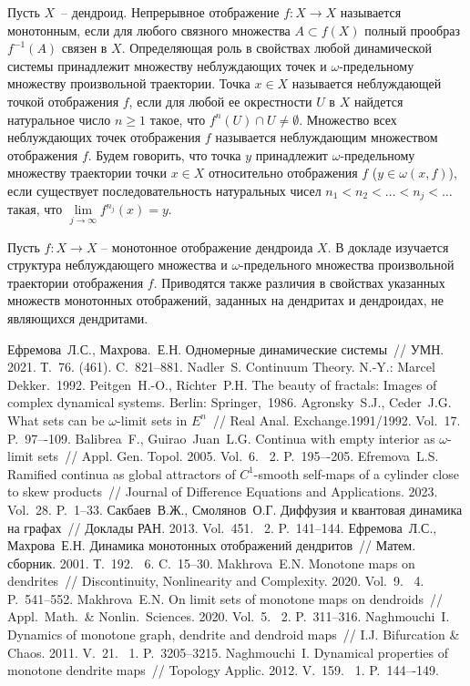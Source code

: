 Пусть $X$~-- дендроид. Непрерывное отображение  $f:X\to X$  называется монотонным, если для любого связного множества $A\subset f(X)$ полный прообраз $f^{-1}(A)$ связен в $X$. Определяющая роль в свойствах любой динамической системы принадлежит множеству неблуждающих точек и $\omega$-предельному множеству произвольной траектории. Точка $x\in X$ называется неблуждающей точкой отображения $f$, если для любой ее окрестности $U$ в $X$ найдется натуральное число $n\ge1$ такое, что $f^n(U)\cap U\ne\emptyset.$ Множество всех неблуждающих точек отображения $f$ называется неблуждающим множеством отображения $f$. Будем говорить, что точка $y$ принадлежит $\omega$-предельному множеству траектории точки $x\in X$ относительно отображения $f$ ($y\in\omega(x,f)$), если существует последовательность натуральных чисел $n_1<n_2<\ldots<n_j<\ldots$ такая, что $\lim\limits_{j\to\infty}f^{n_j}(x)=y$.

Пусть $f:X\to X$ -- монотонное отображение дендроида $X$. В докладе изучается структура неблуждающего множества и $\omega$-предельного множества произвольной траектории отображения $f$. Приводятся также различия в свойствах указанных множеств монотонных отображений, заданных на дендритах и дендроидах, не являющихся дендритами.


\begin{thebibliography}{9} %
Ефремова~Л.С., Махрова.~Е.Н.  Одномерные динамические системы~// УМН. 2021. Т.~76. (461). C.~821--881.
Nadler~S. Continuum Theory.  N.-Y.: Marcel Dekker.~1992.
 Peitgen~H.-O., Richter~P.H.  The beauty of fractals: Images of complex dynamical systems. Berlin: Springer,~1986.
 Agronsky~S.J., Ceder~J.G.  What sets can be $\omega$-limit sets in $E^n$~// Real Anal. Exchange.1991/1992. Vol.~17. P.~97–-109.
 Balibrea~F., Guirao~Juan~L.G.  Continua with empty interior as $\omega$-limit sets~// Appl. Gen. Topol. 2005. Vol.~6. \textnumero~2. P.~195–-205.
Efremova~L.S.  Ramified continua as global attractors of $C^1$-smooth self-maps of a cylinder close to skew products~// Journal of Difference Equations and Applications. 2023. Vol.~28. P.~1--33.
Сакбаев~В.Ж., Смолянов~О.Г.  Диффузия и квантовая динамика на графах~//  Доклады РАН. 2013. Vol.~451. \textnumero~2. P.~141--144.
Ефремова~Л.С., Махрова~Е.Н.  Динамика монотонных отображений дендритов~// Матем. сборник. 2001. Т.~192. \textnumero~6. C.~15--30.
Makhrova~E.N.  Monotone maps on dendrites~// Discontinuity, Nonlinearity  and Complexity. 2020. Vol.~9. \textnumero~4. P.~541--552.
Makhrova~E.N.   On limit sets of monotone maps on dendroids~// Appl.~Math.~\& Nonlin.~Sciences. 2020. Vol.~5. \textnumero~2. P.~311--316.
 Naghmouchi~I. Dynamics of monotone graph, dendrite and dendroid maps~// I.J. Bifurcation \& Chaos. 2011. V.~21. \textnumero~1.  P.~3205--3215.
Naghmouchi~I. Dynamical properties of monotone dendrite maps~// Topology Applic. 2012. V.~159. \textnumero~1.  P.~144–-149.
\end{thebibliography}





% 